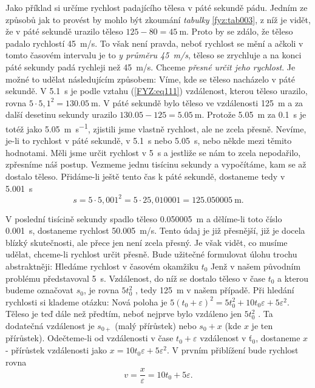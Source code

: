     Jako příklad si určíme rychlost padajícího tělesa v páté sekundě pádu. Jedním ze způsobů jak to 
    provést by mohlo být zkoumání \emph{tabulky} \ref{fyz:tab003}, z níž je vidět, že v páté 
    sekundě urazilo těleso \(125 - 80 = \SI{45}{\m}\). Proto by se zdálo, že těleso padalo 
    rychlostí \SI{45}{\m/\s}. To však není pravda, neboť rychlost se mění a ačkoli v tomto časovém 
    intervalu je to \emph{y průměru \SI{45}{\m/\s}}, těleso se zrychluje a na konci páté sekundy 
    padá rychleji než \SI{45}{\m/\s}. Chceme \emph{přesné určit jeho rychlost}. Je možné to udělat 
    následujícím způsobem: Víme, kde se těleso nacházelo v páté sekundě. V \SI{5.1}{\s} je podle 
    vztahu (\ref{FYZ:eq111}) vzdálenost, kterou těleso urazilo, rovna \(5\cdot5,1^2 = \SI{130.05} 
    {\m}\). V páté sekundě bylo těleso ve vzdálenosti \SI{125}{\m} a za další desetinu sekundy 
    urazilo \(\num{130.05} - \num{125} = \SI{5.05}{\m}\). Protože \SI{5.05}{\m} za \SI{0.1}{\s} je 
    totéž jako \SI{5.05}{\m\per\s}, zjistili jsme vlastně rychlost, ale ne zcela přesně. Nevíme, 
    je-li to rychlost v páté sekundě, v \SI{5.1}{\s} nebo \SI{5.05}{\s}, nebo někde mezi těmito 
    hodnotami. Měli jsme určit rychlost v \SI{5}{\s} a jestliže se nám to zcela nepodařilo, 
    zpřesníme náš postup. Vezmeme jednu tisícinu sekundy a vypočítáme, kam se až dostalo těleso. 
    Přidáme-li ještě tento čas k páté sekundě, dostaneme tedy v \SI{5.001}{\s}
    \begin{equation}\label{FYZ:eq115}
      s = 5\cdot5,001^2 = 5\cdot25,010001 = \SI{125.050005}{\m}.
    \end{equation}
    
    V poslední tisícině sekundy spadlo těleso \SI{0.050005}{\m} a dělíme-li toto číslo 
    \SI{0.001}{\s}, dostaneme rychlost \SI{50.005}{\m/\s}. Tento údaj je již přesnější, již je 
    docela blízký skutečnosti, ale přece jen není zcela přesný. Je však vidět, co musíme udělat, 
    chceme-li rychlost určit přesně. Bude užitečné formulovat úlohu trochu abstraktněji: Hledáme 
    rychlost v časovém okamžiku \(t_0\) Jenž v našem původním problému představoval \SI{5}{\s}. 
    Vzdálenost, do níž se dostalo těleso v čase \(t_0\) a kterou budeme označovat \(s_0\), je rovna 
    \(5t_0^2\) , tedy \SI{125}{\m} v našem případě. Při hledání rychlosti si klademe otázku: 
     Nová poloha 
    je \(5(t_0 + \varepsilon)^2 = 5t_0^2 + 10t_0\varepsilon + 5\varepsilon^2\). Těleso je teď dále 
    než předtím, neboť nejprve bylo vzdáleno jen \(5t_0^2\) . Ta dodatečná vzdálenost je \(s_{0+}\) 
    (malý přírůstek) nebo \(s_0 + x\) (kde \(x\) je ten přírůstek). Odečteme-li od vzdálenosti 
    v čase \(t_0 + \varepsilon\) vzdálenost v \(ť_0\), dostaneme \(x\) - přírůstek vzdálenosti jako 
    \(x = 10t_0\varepsilon +5\varepsilon^2\). V prvním přiblížení bude rychlost rovna
    \begin{equation}\label{FYZ:eq116}
      v = \frac{x}{\varepsilon} = 10t_0 +5\varepsilon.
    \end{equation}
    
